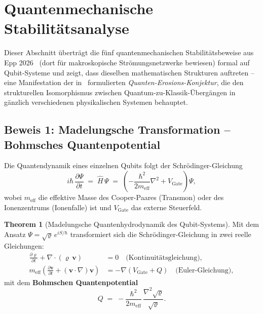 ﻿\documentclass[a4paper,12pt]{article}
\theoremstyle{definition}
\newtheorem{theorem}{Theorem}
\begin{document}
\section{Quantenmechanische Stabilitätsanalyse}
\label{sec:quantenstab}

Dieser Abschnitt überträgt die fünf quantenmechanischen Stabilitätsbeweise aus
Epp 2026~\cite{epp2026cnyn} (dort für makroskopische Strömungsnetzwerke bewiesen)
formal auf Qubit-Systeme und zeigt, dass dieselben mathematischen Strukturen
auftreten -- eine Manifestation der in~\cite{epp2026cnyn} formulierten
\emph{Quanten-Erosions-Konjektur}, die den strukturellen Isomorphismus zwischen
Quantum-zu-Klassik-Übergängen in gänzlich verschiedenen physikalischen Systemen
behauptet.

\subsection{Beweis 1: Madelungsche Transformation -- Bohmsches Quantenpotential}
\label{sec:madelung}

Die Quantendynamik eines einzelnen Qubits folgt der Schrödinger-Gleichung
\[
  i\hbar\,\frac{\partial\Psi}{\partial t} \;=\; \hat{H}\,\Psi
  \;=\; \left(-\frac{\hbar^2}{2m_\mathrm{eff}}\nabla^2 + V_\mathrm{Gate}\right)\Psi,
\]
wobei $m_\mathrm{eff}$ die effektive Masse des Cooper-Paares (Transmon) oder des
Ionenzentrums (Ionenfalle) ist und $V_\mathrm{Gate}$ das externe Steuerfeld.

\begin{theorem}[Madelungsche Quantenhydrodynamik des Qubit-Systems]
\label{thm:madelung}
Mit dem Ansatz $\Psi = \sqrt{\varrho}\,e^{iS/\hbar}$ transformiert sich die
Schrödinger-Gleichung in zwei reelle Gleichungen:
\begin{align}
  \frac{\partial\varrho}{\partial t} + \nabla\cdot(\varrho\,\mathbf{v}) &= 0
  \quad\text{(Kontinuitätsgleichung)}, \label{eq:kontinuität}\\
  m_\mathrm{eff}\left(\frac{\partial\mathbf{v}}{\partial t}
  + (\mathbf{v}\cdot\nabla)\mathbf{v}\right)
  &= -\nabla(V_\mathrm{Gate} + Q) \quad\text{(Euler-Gleichung)}, \label{eq:euler}
\end{align}
mit dem \textbf{Bohmschen Quantenpotential}
\[
  Q \;=\; -\frac{\hbar^2}{2m_\mathrm{eff}}\,\frac{\nabla^2\sqrt{\varrho}}{\sqrt{\varrho}}.
\]
\end{theorem}
\end{document}
